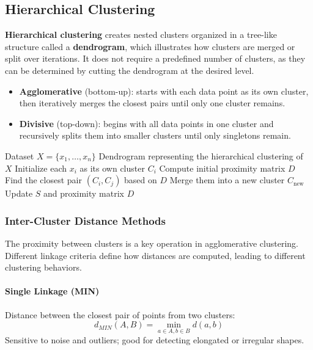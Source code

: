 \subsection{Hierarchical Clustering}
\textbf{Hierarchical clustering} creates nested clusters organized in a tree-like structure called a \textbf{dendrogram}, which illustrates how clusters are merged or split over iterations. It does not require a predefined number of clusters, as they can be determined by cutting the dendrogram at the desired level.

\begin{itemize}
    \item \textbf{Agglomerative} (bottom-up): starts with each data point as its own cluster, then iteratively merges the closest pairs until only one cluster remains.
    \item \textbf{Divisive} (top-down): begins with all data points in one cluster and recursively splits them into smaller clusters until only singletons remain.
\end{itemize}

\begin{algorithm}
\caption{Hierarchical Clustering}
\label{alg:hierarchical}
\begin{algorithmic}[1]
\Require Dataset $X = \{x_1, \ldots, x_n\}$
\Ensure Dendrogram representing the hierarchical clustering of $X$
\State Initialize each $x_i$ as its own cluster $C_i$
\State Compute initial proximity matrix $D$
    \State Find the closest pair $(C_i, C_j)$ based on $D$
    \State Merge them into a new cluster $C_{\text{new}}$
    \State Update $S$ and proximity matrix $D$
\EndWhile
\end{algorithmic}
\end{algorithm}
\subsubsection{Inter-Cluster Distance Methods}
The proximity between clusters is a key operation in agglomerative clustering. Different linkage criteria define how distances are computed, leading to different clustering behaviors.

\paragraph{Single Linkage (MIN)} 
Distance between the closest pair of points from two clusters:
\begin{equation}
d_{MIN}(A, B) = \min_{a \in A, b \in B} d(a, b)
\end{equation}
Sensitive to noise and outliers; good for detecting elongated or irregular shapes.


